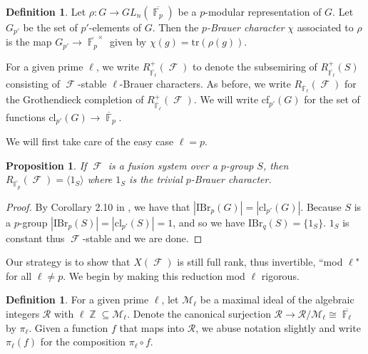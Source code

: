 \documentclass[12pt]{article}
\DeclareMathOperator{\F}{\mathbb{F}}
\DeclareMathOperator{\Z}{\mathbb{Z}}
\DeclareMathOperator{\sF}{\mathcal{F}}
\theoremstyle{plain}
\newtheorem{prop}[thm]{Proposition}
\theoremstyle{definition}
\newtheorem{defn}[thm]{Definition}
\begin{document}
\begin{defn}
Let $\rho \colon G \rightarrow GL_n(\overline{\F_p})$ be a $p$-modular representation of $G$. Let $G_{p'}$ be the set of $p'$-elements of $G$. Then the \emph{$p$-Brauer character} $\chi$ associated to $\rho$ is the map $G_{p'} \rightarrow \overline{\F_p}^{\times}$ given by $\chi(g) = \text{tr}(\rho(g))$.

For a given prime $\ell$, we write $R^+_{\overline{\F_{\ell}}}(\sF)$ to denote the subsemiring of $R^+_{\overline{\F_{\ell}}}(S)$ consisting of $\sF$-stable $\ell$-Brauer characters. As before, we write $R_{\overline{\F}_{\ell}}(\sF)$ for the Grothendieck completion of $R^+_{\overline{\F}_{\ell}}(\sF)$. We will write cf$_{p'}(G)$ for the set of functions $\text{cl}_{p'}(G) \rightarrow \overline{\F}_p$. 
\end{defn}
We will first take care of the easy case $\ell = p$.
\begin{prop}\label{mod p prop}
If $\sF$ is a fusion system over a $p$-group $S$, then $R_{\overline{\F_{p}}}(\sF) = \langle 1_S \rangle$ where $1_S$ is the trivial $p$-Brauer character. 
\end{prop}
\begin{proof}
By Corollary 2.10 in \cite{navarro}, we have that $|\text{IBr}_p(G)| = |\text{cl}_{p'}(G)|$. Because $S$ is a $p$-group $|\text{IBr}_p(S)| = |\text{cl}_{p'}(S)| = 1$, and so we have $\text{IBr}_q(S) = \{1_S\}$. $1_S$ is constant thus $\sF$-stable and we are done.
\end{proof}
Our strategy is to show that $X(\sF)$ is still full rank, thus invertible, ``mod $\ell$" for all $\ell \neq p$. We begin by making this reduction mod $\ell$ rigorous.
\begin{defn}\label{mod p defn}
For a given prime $\ell$, let $\mathcal{M}_{\ell}$ be a maximal ideal of the algebraic integers $\mathcal{R}$ with $\ell\Z \subseteq \mathcal{M}_{\ell}$. 
Denote the canonical surjection $\mathcal{R} \rightarrow \mathcal{R}/\mathcal{M}_{\ell} \cong \overline{\F_{\ell}}$ by $\pi_{\ell}$. 
Given a function $f$ that maps into $\mathcal{R}$, we abuse notation slightly and write $\pi_{\ell}(f)$ for the composition $\pi_{\ell} \circ f$.
\end{defn}
\end{document}
